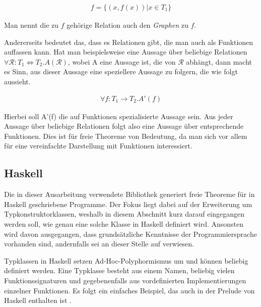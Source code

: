 \begin{align*}
f = \{ (x, f(x)) | x \in T_1 \}
\end{align*}

Man nennt die zu $f$ gehörige Relation auch den \textit{Graphen} zu $f$.

Andererseits bedeutet das, dass es Relationen gibt, die man auch als Funktionen auffassen kann. Hat man beispielsweise
eine Aussage über beliebige Relationen $\forall \mathcal{R} : T_1 \Leftrightarrow T_2 . A(\mathcal{R})$, wobei A eine
Aussage ist, die von $\mathcal{R}$ abhängt, dann macht es Sinn, aus dieser Aussage eine speziellere Aussage zu folgern,
die wie folgt aussieht.

\begin{align*}
\forall f : T_1 \rightarrow T_2 . A'(f)
\end{align*}

Hierbei soll A'(f) die auf Funktionen spezialisierte Aussage sein. Aus jeder Aussage über beliebige Relationen folgt also eine
Aussage über entsprechende Funktionen. Dies ist für freie Theoreme von Bedeutung, da man sich vor allem für eine vereinfachte
Darstellung mit Funktionen interessiert.


\subsection{Haskell}

Die in dieser Ausarbeitung verwendete Bibliothek generiert freie Theoreme für in Haskell geschriebene Programme. Der Fokus
liegt dabei auf der Erweiterung um Typkonstruktorklassen, weshalb in diesem Abschnitt kurz darauf eingegangen werden soll,
wie genau eine solche Klasse in Haskell definiert wird. Ansonsten wird davon ausgegangen, dass grundsätzliche Kenntnisse der
Programmiersprache vorhanden sind, andernfalls sei an dieser Stelle auf \cite{haskell} verwiesen.

Typklassen in Haskell setzen Ad-Hoc-Polyphormismus um und können beliebig definiert werden. Eine Typklasse besteht aus
einem Namen, beliebig vielen Funktionssignaturen und gegebenenfalls aus vordefinierten Implementierungen einzelner
Funktionen. Es folgt ein einfaches Beispiel, das auch in der Prelude von Haskell enthalten ist .

